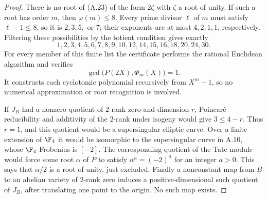 \begin{proof}
There is no root of (A.23) of the form $2\zeta$ with
$\zeta$ a root of unity. If such a root has order $m$, then
$\varphi(m)\le8$. Every prime divisor $\ell$ of $m$ must
satisfy $\ell-1\le8$, so it is $2,3,5,$ or $7$; their
exponents are at most $4,2,1,1$, respectively. Filtering
these possibilities by the totient condition gives exactly
\[
 1,2,3,4,5,6,7,8,9,10,12,14,15,16,18,20,24,30.
\]
For every member of this finite list the certificate performs
the rational Euclidean algorithm and verifies
\[
 \gcd\bigl(P(2X),\Phi_m(X)\bigr)=1.
\]
It constructs each cyclotomic polynomial recursively from
$X^m-1$, so no numerical approximation or root recognition
is involved.

If $J_B$ had a nonzero quotient of $2$-rank zero and dimension
$r$, Poincar\'e reducibility and additivity of the $2$-rank
under isogeny would give $3\le4-r$. Thus $r=1$, and this
quotient would be a supersingular elliptic curve. Over a
finite extension of $\F_4$ it would be isomorphic to the
supersingular curve in A.10, whose $\F_4$-Frobenius is
$[-2]$. The corresponding quotient of the Tate module would
force some root $\alpha$ of $P$ to satisfy
$\alpha^a=(-2)^a$ for an integer $a>0$. This says that
$\alpha/2$ is a root of unity, just excluded. Finally a
nonconstant map from $B$ to an abelian variety of $2$-rank
zero induces a positive-dimensional such quotient of $J_B$,
after translating one point to the origin. No such map exists.
\end{proof}

